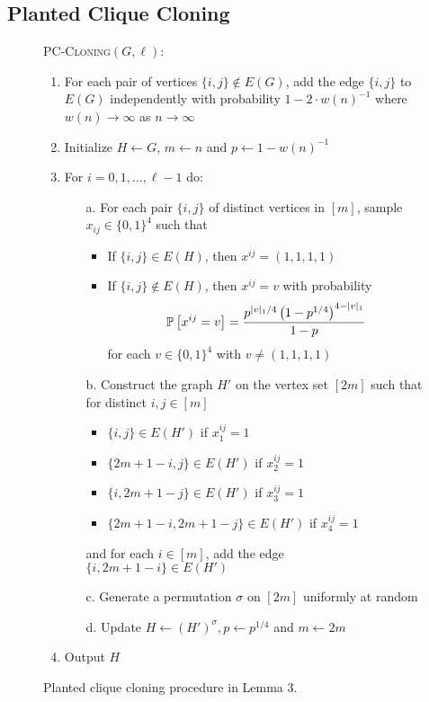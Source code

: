 \documentclass[11pt]{article}
\begin{document}
\subsection{Planted Clique Cloning}

\begin{figure}[t!]
\begin{algbox}
\textsc{PC-Cloning}$(G, \ell)$:
\begin{enumerate}
\item For each pair of vertices $\{i, j\} \not \in E(G)$, add the edge $\{i, j\}$ to $E(G)$ independently with probability $1 - 2 \cdot w(n)^{-1}$ where $w(n) \to \infty$ as $n \to \infty$
\item Initialize $H \gets G$, $m \gets n$ and $p \gets 1 - w(n)^{-1}$
\item For $i = 0, 1, \dots, \ell - 1$ do:
\begin{enumerate}
\item[a.] For each pair $\{ i, j \}$ of distinct vertices in $[m]$, sample $x_{ij} \in \{0, 1\}^4$ such that
\begin{itemize}
\item If $\{i, j\} \in E(H)$, then $x^{ij} = (1, 1, 1, 1)$
\item If $\{i, j\} \not \in E(H)$, then $x^{ij} = v$ with probability
$$\mathbb{P}\left[x^{ij} = v\right] = \frac{p^{|v|_1/4} \left(1 - p^{1/4}\right)^{4 - |v|_1}}{1 - p}$$
for each $v \in \{0, 1\}^4$ with $v \neq (1, 1, 1, 1)$
\end{itemize}
\item[b.] Construct the graph $H'$ on the vertex set $[2m]$ such that for distinct $i, j \in [m]$
\begin{itemize}
\item $\{i, j \} \in E(H')$ if $x^{ij}_1 = 1$
\item $\{2m + 1 - i, j \} \in E(H')$ if $x^{ij}_2 = 1$
\item $\{i, 2m + 1 - j \} \in E(H')$ if $x^{ij}_3 = 1$
\item $\{2m + 1 - i, 2m + 1 - j \} \in E(H')$ if $x^{ij}_4 = 1$
\end{itemize}
and for each $i \in [m]$, add the edge $\{i, 2m + 1 - i \} \in E(H')$
\item[c.] Generate a permutation $\sigma$ on $[2m]$ uniformly at random
\item[d.] Update $H \gets (H')^\sigma, p \gets p^{1/4}$ and $m \gets 2m$
\end{enumerate}
\item Output $H$
\end{enumerate}
\vspace{1mm}
\end{algbox}
\caption{Planted clique cloning procedure in Lemma 3.}
\end{figure}
\end{document}
